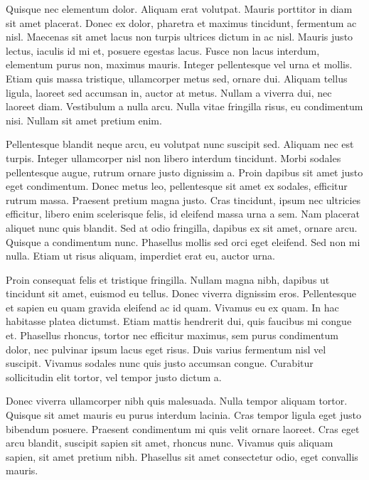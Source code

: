 \documentclass{novanarrative}
\begin{document}
Quisque nec elementum dolor. Aliquam erat volutpat. Mauris porttitor in diam sit amet placerat. Donec ex dolor, pharetra et maximus tincidunt, fermentum ac nisl. Maecenas sit amet lacus non turpis ultrices dictum in ac nisl. Mauris justo lectus, iaculis id mi et, posuere egestas lacus. Fusce non lacus interdum, elementum purus non, maximus mauris. Integer pellentesque vel urna et mollis. Etiam quis massa tristique, ullamcorper metus sed, ornare dui. Aliquam tellus ligula, laoreet sed accumsan in, auctor at metus. Nullam a viverra dui, nec laoreet diam. Vestibulum a nulla arcu. Nulla vitae fringilla risus, eu condimentum nisi. Nullam sit amet pretium enim.

Pellentesque blandit neque arcu, eu volutpat nunc suscipit sed. Aliquam nec est turpis. Integer ullamcorper nisl non libero interdum tincidunt. Morbi sodales pellentesque augue, rutrum ornare justo dignissim a. Proin dapibus sit amet justo eget condimentum. Donec metus leo, pellentesque sit amet ex sodales, efficitur rutrum massa. Praesent pretium magna justo. Cras tincidunt, ipsum nec ultricies efficitur, libero enim scelerisque felis, id eleifend massa urna a sem. Nam placerat aliquet nunc quis blandit. Sed at odio fringilla, dapibus ex sit amet, ornare arcu. Quisque a condimentum nunc. Phasellus mollis sed orci eget eleifend. Sed non mi nulla. Etiam ut risus aliquam, imperdiet erat eu, auctor urna.

Proin consequat felis et tristique fringilla. Nullam magna nibh, dapibus ut tincidunt sit amet, euismod eu tellus. Donec viverra dignissim eros. Pellentesque et sapien eu quam gravida eleifend ac id quam. Vivamus eu ex quam. In hac habitasse platea dictumst. Etiam mattis hendrerit dui, quis faucibus mi congue et. Phasellus rhoncus, tortor nec efficitur maximus, sem purus condimentum dolor, nec pulvinar ipsum lacus eget risus. Duis varius fermentum nisl vel suscipit. Vivamus sodales nunc quis justo accumsan congue. Curabitur sollicitudin elit tortor, vel tempor justo dictum a.

Donec viverra ullamcorper nibh quis malesuada. Nulla tempor aliquam tortor. Quisque sit amet mauris eu purus interdum lacinia. Cras tempor ligula eget justo bibendum posuere. Praesent condimentum mi quis velit ornare laoreet. Cras eget arcu blandit, suscipit sapien sit amet, rhoncus nunc. Vivamus quis aliquam sapien, sit amet pretium nibh. Phasellus sit amet consectetur odio, eget convallis mauris.
\end{document}
